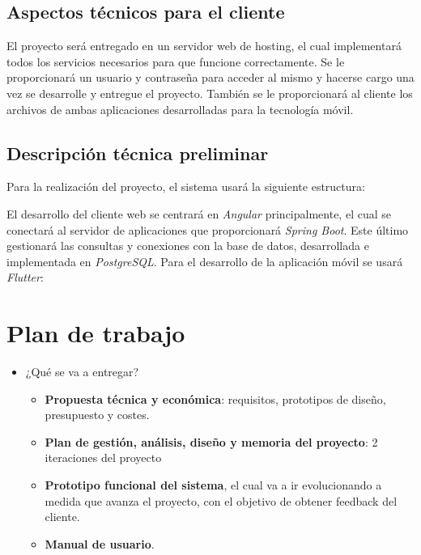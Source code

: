 \documentclass{article}
\begin{document}
\subsection{Aspectos técnicos para el cliente}
El proyecto será entregado en un servidor web de hosting, el cual implementará todos los servicios necesarios para que funcione correctamente. Se le proporcionará un usuario y contraseña para acceder al mismo y hacerse cargo una vez se desarrolle y entregue el proyecto.
\hfill \break
También se le proporcionará al cliente los archivos de ambas aplicaciones desarrolladas para la tecnología móvil.
\begin{figure}[H]

\end{figure}

\newpage
\subsection{Descripción técnica preliminar}
Para la realización del proyecto, el sistema usará la siguiente estructura: \vspace{0.15cm}

\begin{figure}[H]

\end{figure}
\vspace{0.15cm}

El desarrollo del cliente web se centrará en \textit{Angular} principalmente, el cual se conectará al servidor de aplicaciones que proporcionará \textit{Spring Boot}. Este último gestionará las consultas y conexiones con la base de datos, desarrollada e implementada en \textit{PostgreSQL}.
Para el desarrollo de la aplicación móvil se usará \textit{Flutter}:
\begin{figure}[H]

\end{figure}
\newpage

\section{Plan de trabajo}
\begin{itemize}
	\item ¿Qué se va a entregar?
	\begin{itemize}
		\item \textbf{Propuesta técnica y económica}: requisitos, prototipos de diseño, presupuesto y costes.
		\item \textbf{Plan de gestión, análisis, diseño y memoria del proyecto}: 2 iteraciones del proyecto
		\item \textbf{Prototipo funcional del sistema}, el cual va a ir evolucionando a medida que avanza el proyecto, con el objetivo de obtener feedback del cliente.
		\item \textbf{Manual de usuario}.
	\end{itemize}
\end{itemize}
\end{document}
